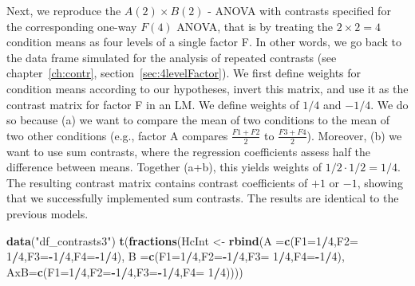 \documentclass[12pt,]{krantz}
\newenvironment{Shaded}{\begin{snugshade}}{\end{snugshade}}
\newcommand{\DataTypeTok}[1]{\textcolor[rgb]{0.13,0.29,0.53}{#1}}
\newcommand{\DecValTok}[1]{\textcolor[rgb]{0.00,0.00,0.81}{#1}}
\newcommand{\KeywordTok}[1]{\textcolor[rgb]{0.13,0.29,0.53}{\textbf{#1}}}
\newcommand{\NormalTok}[1]{#1}
\newcommand{\OperatorTok}[1]{\textcolor[rgb]{0.81,0.36,0.00}{\textbf{#1}}}
\newcommand{\StringTok}[1]{\textcolor[rgb]{0.31,0.60,0.02}{#1}}
\begin{document}
Next, we reproduce the \(A(2) \times B(2)\) - ANOVA with contrasts specified for the corresponding one-way \(F(4)\) ANOVA, that is by treating the \(2 \times 2 = 4\) condition means as four levels of a single factor F. In other words, we go back to the data frame simulated for the analysis of repeated contrasts (see chapter~\ref{ch:contr}, section~\ref{sec:4levelFactor}). We first define weights for condition means according to our hypotheses, invert this matrix, and use it as the contrast matrix for factor F in an LM. We define weights of \(1/4\) and \(-1/4\). We do so because (a) we want to compare the mean of two conditions to the mean of two other conditions (e.g., factor A compares \(\frac{F1 + F2}{2}\) to \(\frac{F3 + F4}{2}\)). Moreover, (b) we want to use sum contrasts, where the regression coefficients assess half the difference between means. Together (a+b), this yields weights of \(1/2 \cdot 1/2 = 1/4\). The resulting contrast matrix contains contrast coefficients of \(+1\) or \(-1\), showing that we successfully implemented sum contrasts. The results are identical to the previous models.

\begin{Shaded}
\begin{Highlighting}[]
\KeywordTok{data}\NormalTok{(}\StringTok{"df_contrasts3"}\NormalTok{)}
\KeywordTok{t}\NormalTok{(}\KeywordTok{fractions}\NormalTok{(HcInt <-}\StringTok{ }\KeywordTok{rbind}\NormalTok{(}\DataTypeTok{A  =}\KeywordTok{c}\NormalTok{(}\DataTypeTok{F1=}\DecValTok{1}\OperatorTok{/}\DecValTok{4}\NormalTok{,}\DataTypeTok{F2=} \DecValTok{1}\OperatorTok{/}\DecValTok{4}\NormalTok{,}\DataTypeTok{F3=}\OperatorTok{-}\DecValTok{1}\OperatorTok{/}\DecValTok{4}\NormalTok{,}\DataTypeTok{F4=}\OperatorTok{-}\DecValTok{1}\OperatorTok{/}\DecValTok{4}\NormalTok{),}
                           \DataTypeTok{B  =}\KeywordTok{c}\NormalTok{(}\DataTypeTok{F1=}\DecValTok{1}\OperatorTok{/}\DecValTok{4}\NormalTok{,}\DataTypeTok{F2=}\OperatorTok{-}\DecValTok{1}\OperatorTok{/}\DecValTok{4}\NormalTok{,}\DataTypeTok{F3=} \DecValTok{1}\OperatorTok{/}\DecValTok{4}\NormalTok{,}\DataTypeTok{F4=}\OperatorTok{-}\DecValTok{1}\OperatorTok{/}\DecValTok{4}\NormalTok{),}
                           \DataTypeTok{AxB=}\KeywordTok{c}\NormalTok{(}\DataTypeTok{F1=}\DecValTok{1}\OperatorTok{/}\DecValTok{4}\NormalTok{,}\DataTypeTok{F2=}\OperatorTok{-}\DecValTok{1}\OperatorTok{/}\DecValTok{4}\NormalTok{,}\DataTypeTok{F3=}\OperatorTok{-}\DecValTok{1}\OperatorTok{/}\DecValTok{4}\NormalTok{,}\DataTypeTok{F4=} \DecValTok{1}\OperatorTok{/}\DecValTok{4}\NormalTok{))))}
\end{Highlighting}
\end{Shaded}
\end{document}
